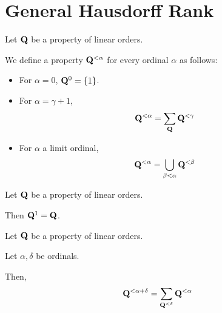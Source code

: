 
\section{General Hausdorff Rank}

\begin{definition}
  Let $\mathbf{Q}$ be a property of linear orders.

  We define a property $\mathbf{Q}^{< \alpha}$
  for every ordinal $\alpha$ as follows:

  \begin{itemize}
    \item For $\alpha = 0$, $\mathbf{Q}^{0} = \left\{ {1} \right\}$.
    \item For $\alpha = \gamma + 1$,
          \[\mathbf{Q}^{< \alpha} = \sum_{\mathbf{Q}}{\mathbf{Q}^{< \gamma}}\]
    \item For $\alpha$ a limit ordinal,
          \[\mathbf{Q}^{< \alpha} = \bigcup_{\beta < \alpha} \mathbf{Q}^{< \beta}\]
  \end{itemize}
\end{definition}

\begin{example}
  Let $\mathbf{Q}$ be a property of linear orders.

  Then $\mathbf{Q}^{1} = \mathbf{Q}$.
\end{example}

\begin{lemma}\label{sum-of-ranks}
  Let $\mathbf{Q}$ be a property of linear orders.

  Let $\alpha, \delta$ be ordinals.

  Then,
  \[
    \mathbf{Q}^{< \alpha + \delta}
    = \sum_{\mathbf{Q}^{< \delta}}{\mathbf{Q}^{< \alpha}}
  \]
\end{lemma}

